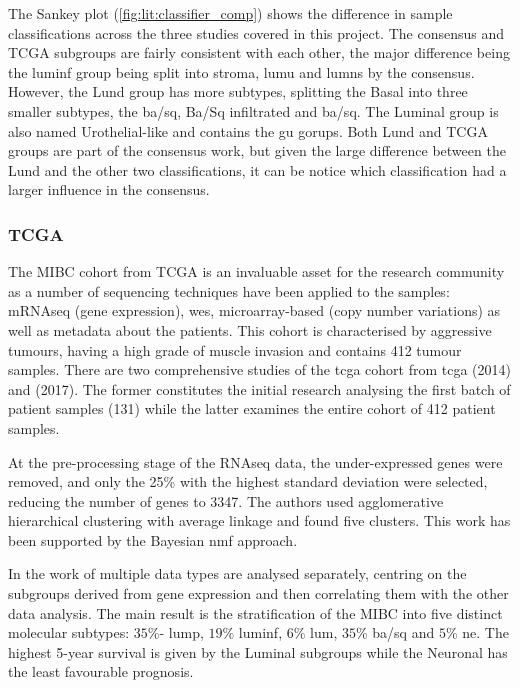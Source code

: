 The Sankey plot (\cref{fig:lit:classifier_comp}) shows the difference in sample classifications across the three studies covered in this project. The consensus and TCGA subgroups are fairly consistent with each other, the major difference being the \acrfull{luminf} group being split into \acrfull{stroma}, \acrfull{lumu} and \acrfull{lumns} by the consensus. However, the Lund group has more subtypes, splitting the Basal into three smaller subtypes, the \acrfull{ba/sq}, Ba/Sq infiltrated and \acrfull{ba/sq}. The Luminal group is also named Urothelial-like and contains the \acrfull{gu} gorups. Both Lund and TCGA groups are part of the consensus work, but given the large difference between the Lund and the other two classifications, it can be notice which classification had a larger influence in the consensus.


\subsubsection*{TCGA} \label{s:lit:tcga_mibc}

The MIBC cohort from TCGA is an invaluable asset for the research community as a number of sequencing techniques have been applied to the samples: mRNAseq (gene expression), \acrfull{wes}, microarray-based (copy number variations) as well as metadata about the patients. This cohort is characterised by aggressive tumours, having a high grade of muscle invasion and contains 412 tumour samples. There are two comprehensive studies of the \acrlong{tcga} cohort from \acrfull{tcga} \citet{Tcga2014-dr} (2014) and \citet{Robertson2017-mg} (2017). The former constitutes the initial research analysing the first batch of patient samples (131) while the latter examines the entire cohort of 412 patient samples. 

At the pre-processing stage of the RNAseq data, the under-expressed genes were removed, and only the 25\% with the highest standard deviation were selected, reducing the number of genes to 3347. The authors used agglomerative hierarchical clustering with average linkage and found five clusters. This work has been supported by the Bayesian \acrfull{nmf} \cite{Schmidt2009-zh} approach.

In the work of \citet{Robertson2017-mg} multiple data types are analysed separately, centring on the subgroups derived from gene expression and then correlating them with the other data analysis. The main result is the stratification of the MIBC into five distinct molecular subtypes: $35\%$- \acrfull{lump}, $19\%$ \acrfull{luminf}, $6\%$ \acrfull{lum}, $35\%$ \acrfull{ba/sq} and $5\%$ \acrfull{ne}. The highest 5-year survival is given by the Luminal subgroups while the Neuronal has the least favourable prognosis. 

